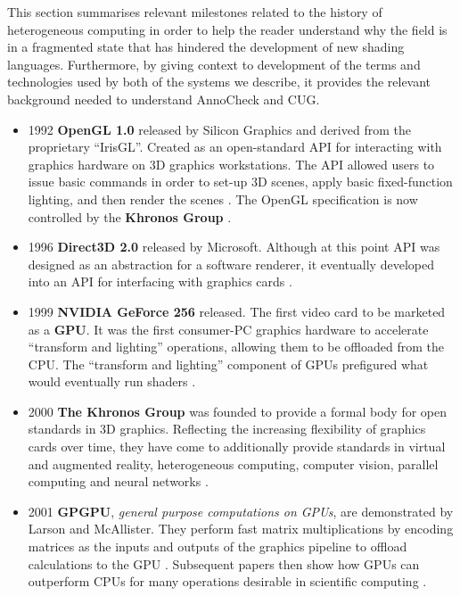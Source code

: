 \documentclass[a4paper,12pt,twoside,openright]{report}
\begin{document}
This section summarises relevant milestones related to the history of
heterogeneous computing in order to help the reader understand why the field is
in a fragmented state that has hindered the development of new shading
languages. Furthermore, by giving context to development of the terms and
technologies used by both of the systems we describe, it provides the relevant
background needed to understand AnnoCheck and CUG.

\begin{itemize}

    \item 1992 \textbf{OpenGL 1.0} released by Silicon Graphics and derived
    from the proprietary ``IrisGL''. Created as an open-standard API for
    interacting with graphics hardware on 3D graphics workstations. The API
    allowed users to issue basic commands in order to set-up 3D scenes, apply
    basic fixed-function lighting, and then render the scenes
    \cite{OpenGL_1_0}. The OpenGL specification is now controlled by the
    \textbf{Khronos Group} \cite{OpenGL} \cite{OpenGLToKhronos}.

    \item 1996 \textbf{Direct3D 2.0} released by Microsoft. Although at this
    point API was designed as an abstraction for a software renderer, it
    eventually developed into an API for interfacing with graphics cards
    \cite{JohnCarmackPlanDirect3DvsOpenGl}.

    \item 1999 \textbf{NVIDIA GeForce 256} released. The first video card to be
    marketed as a \textbf{GPU}. It was the first consumer-PC graphics hardware
    to accelerate ``transform and lighting'' operations, allowing them to be
    offloaded from the CPU. The ``transform and lighting'' component of GPUs
    prefigured what would eventually run shaders \cite{GeForce256}.

    \item 2000 \textbf{The Khronos Group} was founded to provide a formal body
    for open standards in 3D graphics. Reflecting the increasing flexibility of
    graphics cards over time, they have come to additionally provide standards
    in virtual and augmented reality, heterogeneous computing, computer vision,
    parallel computing and neural networks \cite{KhronosGroupAbout}.

    \item 2001 \textbf{GPGPU}, \textit{general purpose computations on GPUs},
    are demonstrated by Larson and McAllister. They perform fast matrix
    multiplications by encoding matrices as the inputs and outputs of the
    graphics pipeline to offload calculations to the GPU \cite{MatrixGPU}.
    Subsequent papers then show how GPUs can outperform CPUs for many
    operations desirable in scientific computing \cite{CUDAtoOpenCL}
    \cite{Kruger03linearalgebra} \cite{LUGPU} \cite{SparsematrixGPU}.


\end{itemize}
\end{document}
